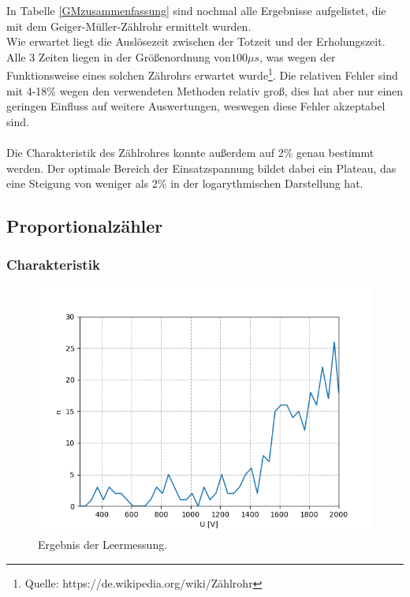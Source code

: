 \documentclass[12pt,a4paper]{article}
\begin{document}
In Tabelle \ref{GMzusammenfassung} sind nochmal alle Ergebnisse aufgelistet, die mit dem Geiger-Müller-Zählrohr ermittelt wurden.\\
Wie erwartet liegt die Auslösezeit zwischen der Totzeit und der Erholungszeit. Alle 3 Zeiten liegen in der Größenordnung von$100\mu s$, was wegen der Funktionsweise eines solchen Zährohrs erwartet wurde\footnote{Quelle: https://de.wikipedia.org/wiki/Zählrohr}. Die relativen Fehler sind mit 4-18\% wegen den verwendeten Methoden relativ groß, dies hat aber nur einen geringen Einfluss auf weitere Auswertungen, weswegen diese Fehler akzeptabel sind.\\
\\
Die Charakteristik des Zählrohres konnte außerdem auf 2\% genau bestimmt werden. Der optimale Bereich der Einsatzspannung bildet dabei ein Plateau, das eine Steigung von weniger als 2\% in der logarythmischen Darstellung hat. 

\newpage
\subsection{Proportionalzähler}

\subsubsection{Charakteristik}


\begin{figure}
\centering
\includegraphics[scale=0.8]{Bilder/Prop/leer.PNG}
\caption{Ergebnis der Leermessung.}
\label{fig:leer}
\end{figure}
\end{document}
